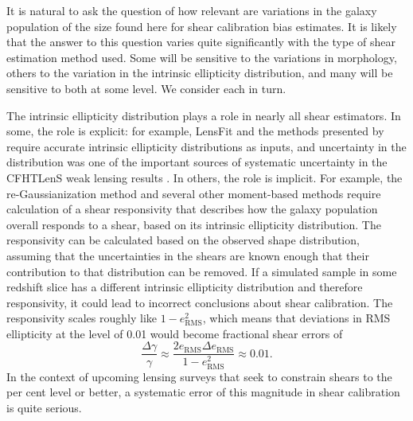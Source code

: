 \documentclass[twocolumn,useAMS,usenatbib]{mn2e}
\begin{document}
It is natural to ask the question of how relevant are variations in
the galaxy population of the size found here for shear calibration
bias estimates.  It is likely that the answer to this question varies
quite significantly with the type of shear estimation method used.
Some will be sensitive to the variations in morphology, others to the
variation in the intrinsic ellipticity distribution, and many will be
sensitive to both at some level.  We consider each in turn.

The intrinsic ellipticity distribution plays a role in nearly all
shear estimators.  In some, the role is explicit: for example, LensFit
\citep{2007MNRAS.382..315M,2008MNRAS.390..149K,2013MNRAS.429.2858M}
and the methods presented by \cite{2014MNRAS.438.1880B} require
accurate intrinsic ellipticity distributions as inputs, and
uncertainty in the distribution was one of the important sources of
systematic uncertainty in the CFHTLenS weak lensing results
\citep{2013MNRAS.432.2433H,2013MNRAS.429.2858M}.  In others, the role
is implicit.  For example, the re-Gaussianization method and several
other moment-based methods require calculation of a shear responsivity
\citep{BJ02,HS03} that describes how the galaxy population overall
responds to a shear, based on its intrinsic ellipticity distribution.
The responsivity can be calculated based on the observed shape
distribution, assuming that the uncertainties in the shears are known
enough that their contribution to that distribution can be removed.
If a simulated sample in some redshift slice has a different intrinsic
ellipticity distribution and therefore responsivity, it could lead to
incorrect conclusions about shear calibration.  The responsivity
scales roughly like $1-e_\text{RMS}^2$, which means that deviations in
RMS ellipticity at the level of 0.01 would become fractional shear
errors of
\begin{equation}
\frac{\Delta\gamma}{\gamma} \approx \frac{2 e_\text{RMS} \Delta
  e_\text{RMS} }{1-e_\text{RMS}^2} \approx 0.01.
\end{equation}
In the context of upcoming lensing surveys that seek to constrain
shears to the per cent level or better, a systematic error of this
magnitude in shear calibration is quite serious.
\end{document}
